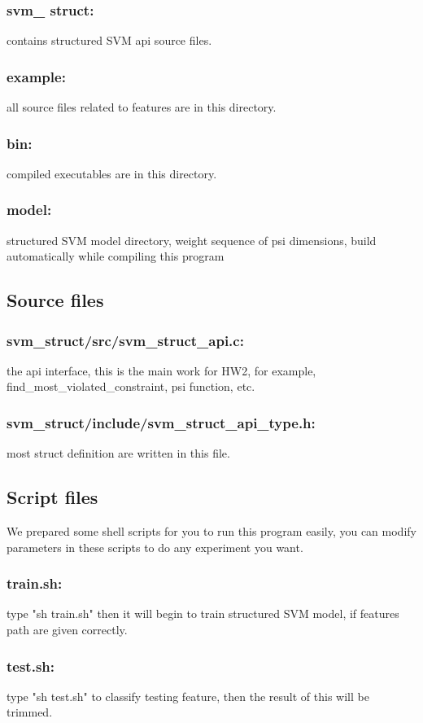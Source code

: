 \documentclass[10pt,a4paper]{article}
\begin{document}
\subsubsection*{svm\_ struct:}
contains structured SVM api source files.
\subsubsection*{example:}
all source files related to features are in this directory.
\subsubsection*{bin:}
compiled executables are in this directory.
\subsubsection*{model:}
structured SVM model directory, weight sequence of psi dimensions, build automatically while compiling this program

\subsection{Source files}
\subsubsection*{svm\_struct/src/svm\_struct\_api.c:}
the api interface, this is the main work for HW2, for example, find\_most\_violated\_constraint, psi function, etc.
\subsubsection*{svm\_struct/include/svm\_struct\_api\_type.h:}
most struct definition are written in this file.
\subsection{Script files}
We prepared some shell scripts for you to run this program easily, you can modify parameters in these scripts to do any experiment you want.
\subsubsection*{train.sh:}
type "sh train.sh" then it will begin to train structured SVM model, if features path are given correctly.
\subsubsection*{test.sh:}
type "sh test.sh" to classify testing feature, then the result of this will be trimmed.
\end{document}
